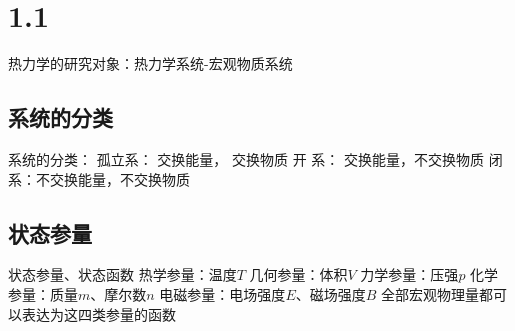 \section{1.1}




热力学的研究对象：热力学系统-宏观物质系统

\subsection{系统的分类}
系统的分类：
孤立系：  交换能量，  交换物质
开  系：  交换能量，不交换物质
闭  系：不交换能量，不交换物质




\subsection{状态参量}
状态参量、状态函数
热学参量：温度$T$
几何参量：体积$V$
力学参量：压强$p$
化学参量：质量$m$、摩尔数$n$
电磁参量：电场强度$E$、磁场强度$B$
全部宏观物理量都可以表达为这四类参量的函数


